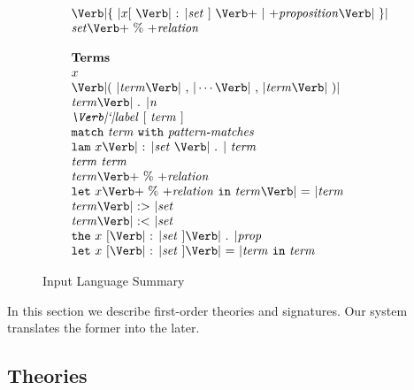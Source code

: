 \begin{figure*}[t]
\[\begin{array}[t]{l}
\LBRACE \Ident [\ \COLON \Setexp\ ]\ \BAR \Proposition \RBRACE\\
\Setexp \PERCENT \metav{relation}\\
\\
\mbox{\textbf{Terms}}\\
x\\
\LPAREN \Term\COMMA \cdots \COMMA \Term \RPAREN\\
\Term\PERIOD \metav{n}\\
\Label\ [\ \Term\ ]\\
\MATCH\ \Term\ \WITH\ \mbox{\textit{pattern-matches}}\\
\LAMBDA\ x\COLON\Set\ \PERIOD\ \Term\\
\Term\ \Term\\
\Term \PERCENT \metav{relation}\\
\LET\ x \PERCENT \metav{relation}\ \IN\ \Term\EQUALS\Term\\
\Term \SUBIN \Set\\
\Term \SUBOUT \Set\\
\THE\ x\ [\COLON\Set\ ] \PERIOD \Prop\\
\LET\ x\ [\COLON\Set\ ] \EQUALS\Term\ \IN\ \Term
\end{array}
\]  
\vspace{-0.6truecm}
\caption{Input Language Summary}
\label{fig:input}  
\end{figure*}

In this section we describe first-order theories and signatures.
Our system translates the former into the later.

\subsection{Theories}
\label{sec:theories}

